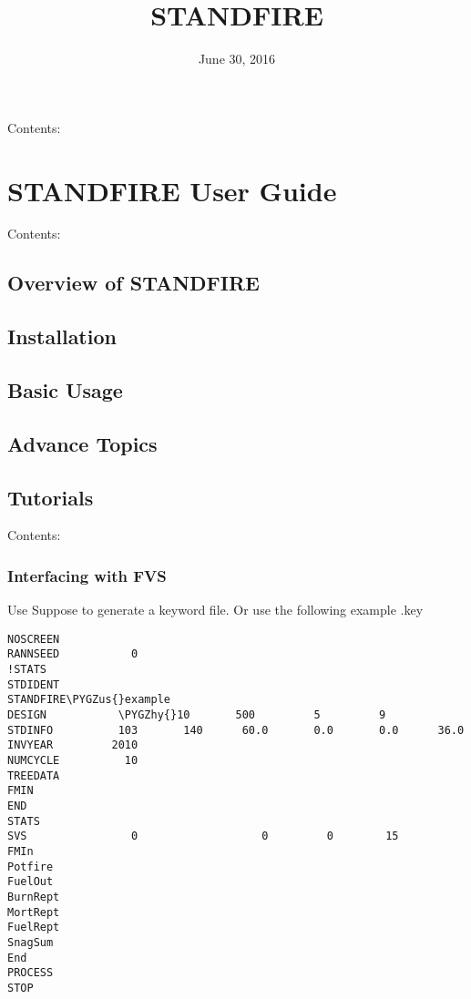 \documentclass[letterpaper,10pt,english]{sphinxmanual}
\title{STANDFIRE}
\date{June 30, 2016}
\author{}
\def\PYGZus{\char`\_}
\def\PYGZhy{\char`\-}
\begin{document}
\maketitle
\tableofcontents
{}\label{index::doc}


Contents:


\chapter{STANDFIRE User Guide}
\label{user_guide:standfire-user-guide}\label{user_guide::doc}\label{user_guide:welcome-to-standfire}
Contents:


\section{Overview of STANDFIRE}
\label{overview:overview-of-standfire}\label{overview::doc}

\section{Installation}
\label{installation:installation}\label{installation::doc}

\section{Basic Usage}
\label{basic_usage::doc}\label{basic_usage:basic-usage}

\section{Advance Topics}
\label{advance_topics:advance-topics}\label{advance_topics::doc}

\section{Tutorials}
\label{tutorials:tutorials}\label{tutorials::doc}
Contents:


\subsection{Interfacing with FVS}
\label{interfacing_with_fvs:interfacing-with-fvs}\label{interfacing_with_fvs::doc}
Use Suppose to generate a keyword file. Or use the following example .key

\begin{Verbatim}[commandchars=\\\{\}]
NOSCREEN
RANNSEED           0
!STATS
STDIDENT
STANDFIRE\PYGZus{}example
DESIGN           \PYGZhy{}10       500         5         9
STDINFO          103       140      60.0       0.0       0.0      36.0
INVYEAR         2010
NUMCYCLE          10
TREEDATA
FMIN
END
STATS
SVS                0                   0         0        15
FMIn
Potfire
FuelOut
BurnRept
MortRept
FuelRept
SnagSum
End
PROCESS
STOP
\end{Verbatim}
\end{document}
